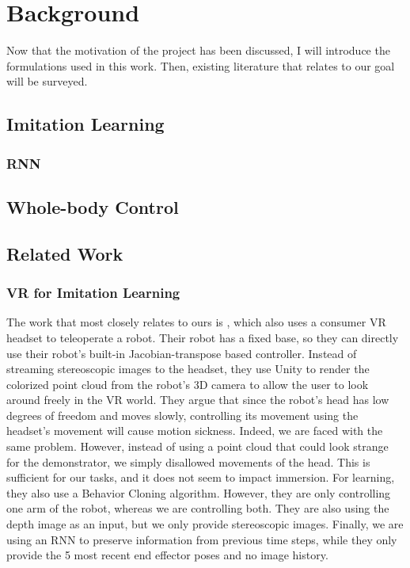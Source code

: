 \chapter{Background}

Now that the motivation of the project has been discussed, I will introduce the formulations used in this work. Then, existing literature that relates to our goal will be surveyed.

\section{Imitation Learning}
\subsection{RNN}

\section{Whole-body Control}

\section{Related Work}

\subsection{VR for Imitation Learning}

The work that most closely relates to ours is \cite{zhang2018deep}, which also uses a consumer VR headset to teleoperate a robot. 
Their robot has a fixed base, so they can directly use their robot's built-in Jacobian-transpose based controller. 
Instead of streaming stereoscopic images to the headset, they use Unity to render the colorized point cloud from the robot's 3D camera to allow the user to look around freely in the VR world. 
They argue that since the robot's head has low degrees of freedom and moves slowly, controlling its movement using the headset's movement will cause motion sickness. 
Indeed, we are faced with the same problem. 
However, instead of using a point cloud that could look strange for the demonstrator, we simply disallowed movements of the head.
This is sufficient for our tasks, and it does not seem to impact immersion. 
For learning, they also use a Behavior Cloning algorithm. 
However, they are only controlling one arm of the robot, whereas we are controlling both. 
They are also using the depth image as an input, but we only provide stereoscopic images. 
Finally, we are using an RNN to preserve information from previous time steps, while they only provide the 5 most recent end effector poses and no image history. 

